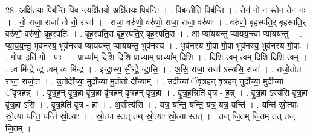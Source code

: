 \documentclass[17pt]{extarticle}
\begin{document}
28. अक्षि॑तयः॒ पिब॑न्ति॒ पिब॒ न्त्यक्षि॑तयो॒ अक्षि॑तयः॒ पिब॑न्ति । . पिब॒न्तीति॒ पिब॑न्ति । . तेन॑ नो न॒ स्तेन॒ तेन॑ नः । . नो॒ राजा॒ राजा॑ नो नो॒ राजा᳚ । . राजा॒ वरु॑णो॒ वरु॑णो॒ राजा॒ राजा॒ वरु॑णः । . वरु॑णो॒ बृह॒स्पति॒र् बृह॒स्पति॒र् वरु॑णो॒ वरु॑णो॒ बृह॒स्पतिः॑ । . बृह॒स्पति॒रा बृह॒स्पति॒र् बृह॒स्पति॒रा । . आ प्या॑ययन्तु प्यायय॒न्त्वा प्या॑ययन्तु । . प्या॒य॒य॒न्तु॒ भुव॑नस्य॒ भुव॑नस्य प्याययन्तु प्याययन्तु॒ भुव॑नस्य । . भुव॑नस्य गो॒पा गो॒पा भुव॑नस्य॒ भुव॑नस्य गो॒पाः । . गो॒पा इति॑ गो - पाः । . प्राच्या᳚म् दि॒शि दि॒शि प्राच्या॒म् प्राच्या᳚म् दि॒शि । . दि॒शि त्वम् त्वम् दि॒शि दि॒शि त्वम् । . त्व मि॑न्द्रे न्द्र॒ त्वम् त्व मि॑न्द्र । . इ॒न्द्रा॒स्य॒ सी॒न्द्रे॒ न्द्रा॒सि॒ । . अ॒सि॒ राजा॒ राजा᳚ ऽस्यसि॒ राजा᳚ । . राजो॒तोत राजा॒ राजो॒त । . उ॒तोदी᳚च्या॒ मुदी᳚च्या मु॒तोतो दी᳚च्याम् । . उदी᳚च्यां ॅवृत्रहन् वृत्रह॒न् नुदी᳚च्या॒ मुदी᳚च्यां ॅवृत्रहन्न् । . वृ॒त्र॒ह॒न् वृ॒त्र॒हा वृ॑त्र॒हा वृ॑त्रहन् वृत्रहन् वृत्र॒हा । . वृ॒त्र॒ह॒न्निति॑ वृत्र - ह॒न्न् । . वृ॒त्र॒हा ऽस्य॑सि वृत्र॒हा वृ॑त्र॒हा ऽसि॑ । . वृ॒त्र॒हेति॑ वृत्र - हा । . अ॒सीत्य॑सि । . यत्र॒ यन्ति॒ यन्ति॒ यत्र॒ यत्र॒ यन्ति॑ । . यन्ति॑ स्रो॒त्याः स्रो॒त्या यन्ति॒ यन्ति॑ स्रो॒त्याः । . स्रो॒त्या स्तत् तथ् स्रो॒त्याः स्रो॒त्या स्तत् । . तज् जि॒तम् जि॒तम् तत् तज् जि॒तम् । \newline
\end{document}
